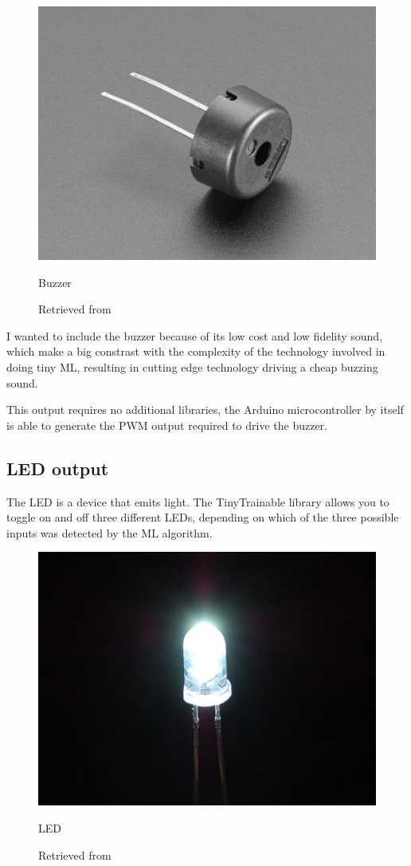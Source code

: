 \begin{figure}[ht]
  \centering
  \includegraphics[width=0.75\linewidth,height=0.25\textheight,keepaspectratio]{images/materials-adafruit-buzzer.jpg}
  \caption{Buzzer}
  \caption*{Retrieved from \cite{website-materials-adafruit-buzzer}}
  \label{fig:materials-adafruit-buzzer}
\end{figure}

I wanted to include the buzzer because of its low cost and low fidelity sound, which make a big constrast with the complexity of the technology involved in doing tiny \acrshort{ML}, resulting in cutting edge technology driving a cheap buzzing sound. 

This output requires no additional libraries, the Arduino microcontroller by itself is able to generate the \acrfull{PWM} output required to drive the buzzer.

\subsection{LED output}

The \acrshort{LED} is a device that emits light. The TinyTrainable library allows you to toggle on and off three different LEDs, depending on which of the three possible inputs was detected by the \acrshort{ML} algorithm.

\begin{figure}[ht]
  \centering
  \includegraphics[width=0.75\linewidth,height=0.25\textheight,keepaspectratio]{images/materials-adafruit-led.jpg}
  \caption{LED}
  \caption*{Retrieved from \cite{website-materials-adafruit-led}}
  \label{fig:materials-adafruit-led}
\end{figure}

